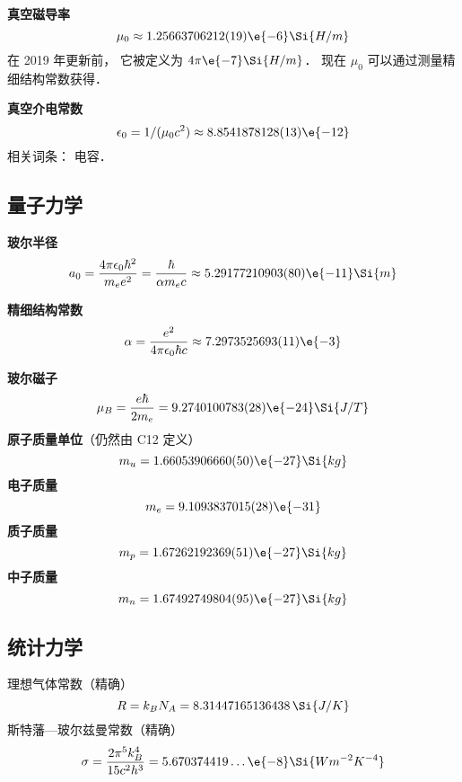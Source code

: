 \textbf{真空磁导率}
\begin{equation}
\mu_0 \approx 1.25663706212(19)\e{-6} \Si{H/m}
\end{equation}
在 2019 年更新前， 它被定义为 $4\pi\e{-7} \Si{H/m}$． 现在 $\mu_0$ 可以通过测量精细结构常数获得．

\textbf{真空介电常数}
\begin{equation}
\epsilon_0 = 1/(\mu_0 c^2) \approx 8.8541878128(13)\e{-12}
\end{equation}
相关词条： 电容．

\subsection{量子力学}
\textbf{玻尔半径}
\begin{equation}
a_0 = \frac{4\pi \epsilon_0 \hbar^2}{m_e e^2} = \frac{\hbar}{\alpha m_e c} \approx 5.29177210903(80)\e{-11}\Si{m}
\end{equation}

\textbf{精细结构常数}
\begin{equation}
\alpha = \frac{e^2}{4\pi\epsilon_0\hbar c} \approx 7.2973525693(11)\e{-3}
\end{equation}

\textbf{玻尔磁子}
\begin{equation}
\mu_B = \frac{e\hbar}{2m_e} = 9.2740100783(28)\e{-24} \Si{J/T}
\end{equation}
\textbf{原子质量单位}（仍然由 C12 定义）
\begin{equation}
m_u = 1.66053906660(50)\e{-27} \Si{kg}
\end{equation}
\textbf{电子质量}
\begin{equation}
m_e = 9.1093837015(28)\e{-31}
\end{equation}
\textbf{质子质量}
\begin{equation}
m_p = 1.67262192369(51)\e{-27}\Si{kg}
\end{equation}
\textbf{中子质量}
\begin{equation}
m_n = 1.67492749804(95)\e{-27}\Si{kg}
\end{equation}

\subsection{统计力学}
理想气体常数（精确）
\begin{equation}
R = k_B N_A = 8.31447165136438 \,\Si{J/K}
\end{equation}
斯特藩—玻尔兹曼常数（精确）
\begin{equation}
\sigma = \frac{2\pi^5k_B^4}{15c^2h^3} = 5.670374419\dots\e{-8} \Si{Wm^{-2}K^{-4}}
\end{equation}
